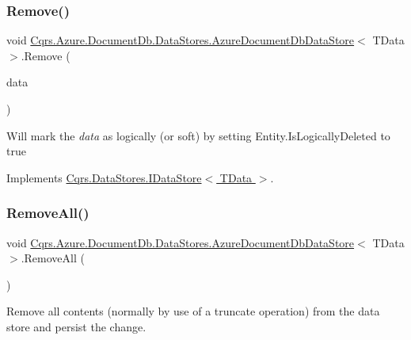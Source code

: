 \subsubsection{\texorpdfstring{Remove()}{Remove()}}
{\footnotesize\ttfamily void \hyperlink{classCqrs_1_1Azure_1_1DocumentDb_1_1DataStores_1_1AzureDocumentDbDataStore}{Cqrs.\+Azure.\+Document\+Db.\+Data\+Stores.\+Azure\+Document\+Db\+Data\+Store}$<$ T\+Data $>$.Remove (\begin{DoxyParamCaption}\item[{T\+Data}]{data }\end{DoxyParamCaption})}



Will mark the {\itshape data}  as logically (or soft) by setting Entity.\+Is\+Logically\+Deleted to true 



Implements \hyperlink{interfaceCqrs_1_1DataStores_1_1IDataStore_a7ef540796bbe4257296841590bc23478_a7ef540796bbe4257296841590bc23478}{Cqrs.\+Data\+Stores.\+I\+Data\+Store$<$ T\+Data $>$}.

\mbox{\label{classCqrs_1_1Azure_1_1DocumentDb_1_1DataStores_1_1AzureDocumentDbDataStore_a0d72cc318e98e01b3dbed86d412a8778_a0d72cc318e98e01b3dbed86d412a8778}} 
\subsubsection{\texorpdfstring{Remove\+All()}{RemoveAll()}}
{\footnotesize\ttfamily void \hyperlink{classCqrs_1_1Azure_1_1DocumentDb_1_1DataStores_1_1AzureDocumentDbDataStore}{Cqrs.\+Azure.\+Document\+Db.\+Data\+Stores.\+Azure\+Document\+Db\+Data\+Store}$<$ T\+Data $>$.Remove\+All (\begin{DoxyParamCaption}{ }\end{DoxyParamCaption})}



Remove all contents (normally by use of a truncate operation) from the data store and persist the change. 




